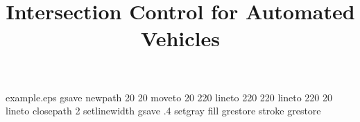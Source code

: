%
%
%
%
%
\begin{filecontents*}{example.eps}
gsave
newpath
  20 20 moveto
  20 220 lineto
  220 220 lineto
  220 20 lineto
closepath
2 setlinewidth
gsave
  .4 setgray fill
grestore
stroke
grestore
\end{filecontents*}
%
\RequirePackage{fix-cm}
%
\documentclass[twocolumn]{svjour3}          %
%
\smartqed  %
%
\usepackage{graphicx}
\graphicspath{{../IntersectionCore/}{../IntersectionCore/method_fig/}}
%
%
\usepackage[numbers]{natbib} %
\usepackage{bm}
\usepackage{amsmath} %
%
%
%



\title{Intersection Control for Automated Vehicles }
\thanks{ This research was made possible thanks to the financial support of a Full-time EPSRC Doctoral Training Partnership Studentship Institute for Transpoirt Studies and also thanks to CASE partner Guidance Automation Limited. 
}

